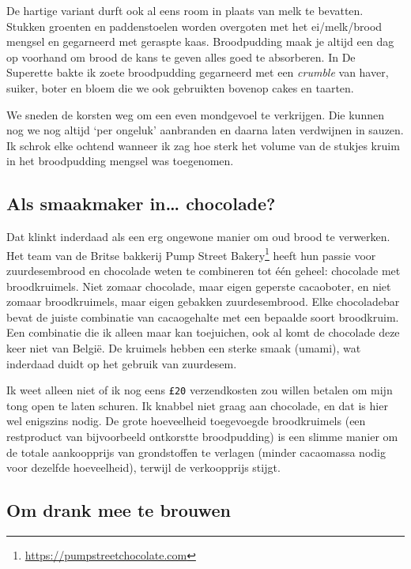\documentclass[
  11pt,
  dutch,
]{memoir}
\begin{document}
De hartige variant durft ook al eens room in plaats van melk te
bevatten. Stukken groenten en paddenstoelen worden overgoten met het
ei/melk/brood mengsel en gegarneerd met geraspte kaas. Broodpudding maak
je altijd een dag op voorhand om brood de kans te geven alles goed te
absorberen. In De Superette bakte ik zoete broodpudding gegarneerd met
een \emph{crumble} van haver, suiker, boter en bloem die we ook
gebruikten bovenop cakes en taarten.

We sneden de korsten weg om een even mondgevoel te verkrijgen. Die
kunnen nog we nog altijd `per ongeluk' aanbranden en daarna laten
verdwijnen in sauzen. Ik schrok elke ochtend wanneer ik zag hoe sterk
het volume van de stukjes kruim in het broodpudding mengsel was
toegenomen.

\hypertarget{als-smaakmaker-in-chocolade}{%
\subsection{Als smaakmaker in\ldots{}
chocolade?}\label{als-smaakmaker-in-chocolade}}

Dat klinkt inderdaad als een erg ongewone manier om oud brood te
verwerken. Het team van de Britse bakkerij Pump Street Bakery\footnote{\url{https://pumpstreetchocolate.com}}
heeft hun passie voor zuurdesembrood en chocolade weten te combineren
tot één geheel: chocolade met broodkruimels. Niet zomaar chocolade, maar
eigen geperste cacaoboter, en niet zomaar broodkruimels, maar eigen
gebakken zuurdesembrood. Elke chocoladebar bevat de juiste combinatie
van cacaogehalte met een bepaalde soort broodkruim. Een combinatie die
ik alleen maar kan toejuichen, ook al komt de chocolade deze keer niet
van België. De kruimels hebben een sterke smaak (umami), wat inderdaad
duidt op het gebruik van zuurdesem.

Ik weet alleen niet of ik nog eens \texttt{£20} verzendkosten zou willen
betalen om mijn tong open te laten schuren. Ik knabbel niet graag aan
chocolade, en dat is hier wel enigszins nodig. De grote hoeveelheid
toegevoegde broodkruimels (een restproduct van bijvoorbeeld ontkorstte
broodpudding) is een slimme manier om de totale aankoopprijs van
grondstoffen te verlagen (minder cacaomassa nodig voor dezelfde
hoeveelheid), terwijl de verkoopprijs stijgt.

\hypertarget{om-drank-mee-te-brouwen}{%
\subsection{Om drank mee te brouwen}\label{om-drank-mee-te-brouwen}}
\end{document}

